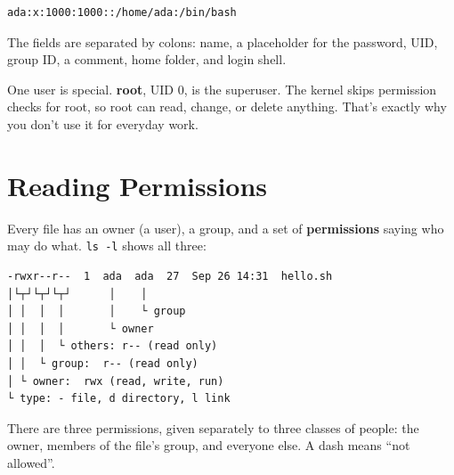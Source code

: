 \begin{codeblock}
\begin{Verbatim}[formatcom=\outputstyle]
ada:x:1000:1000::/home/ada:/bin/bash
\end{Verbatim}
\end{codeblock}

The fields are separated by colons: name, a placeholder for the password, UID, group ID, a comment, home folder, and login shell.

One user is special. \textbf{root}, UID 0, is the superuser. The kernel skips permission checks for root, so root can read, change, or delete anything. That's exactly why you don't use it for everyday work.


\section{Reading Permissions}\label{03-files-folders-and-who-may-touch-them:reading-permissions}

Every file has an owner (a user), a group, and a set of \textbf{permissions} saying who may do what. \texttt{ls\ -l} shows all three:

\begin{codeblock}
\begin{Verbatim}[breaklines=false, fontsize=\fontsize{8.8}{8.68}\selectfont, fontfamily=diagrammono, formatcom=\diagramlines]
-rwxr--r--  1  ada  ada  27  Sep 26 14:31  hello.sh
│└┬┘└┬┘└┬┘      │    │
│ │  │  │       │    └ group
│ │  │  │       └ owner
│ │  │  └ others: r-- (read only)
│ │  └ group:  r-- (read only)
│ └ owner:  rwx (read, write, run)
└ type: - file, d directory, l link
\end{Verbatim}
\end{codeblock}

There are three permissions, given separately to three classes of people: the owner, members of the file's group, and everyone else. A dash means ``not allowed''.


